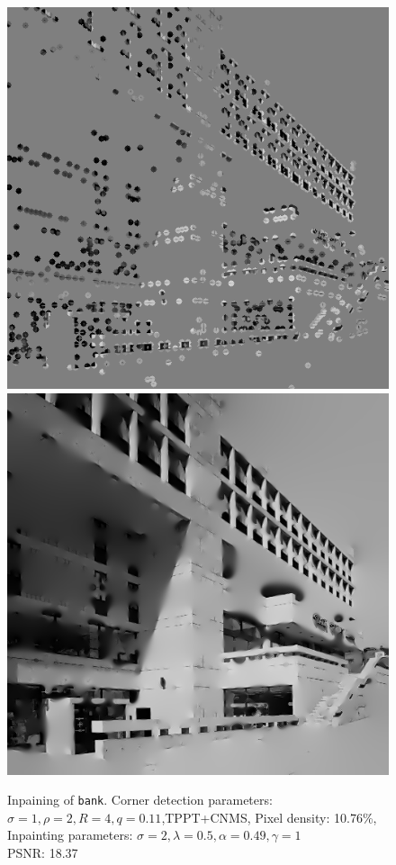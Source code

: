 \begin{figure}[htpb]
    \centering
    \includegraphics[width=0.4\linewidth]{../Images/bank/bankr2m4mask.png}
    \includegraphics[width=0.4\linewidth]{../Images/bank/bankr2m4inpaint.png}\\\vspace{0.2cm}
    \caption{Inpaining of \texttt{bank}. Corner detection parameters:
        $\sigma=1,\rho=2,R=4,q=0.11$,TPPT+CNMS,
    Pixel density: 10.76\%, Inpainting parameters: $\sigma=2,\lambda=0.5,\alpha=0.49,\gamma=1$\\
PSNR: 18.37}\label{fig:BankEx}
\end{figure}


